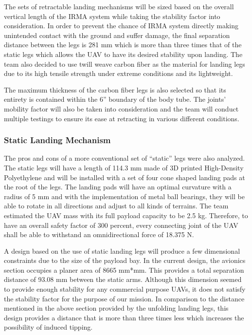 			The sets of retractable landing mechanisms will be sized based on the overall vertical length of the IRMA system while taking the stability factor into consideration. In order to prevent the chance of IRMA system directly making unintended contact with the ground and suffer damage, the final separation distance between the legs is 281 mm which is more than three times that of the static legs which allows the UAV to have its desired stability upon landing. The team also decided to use twill weave carbon fiber as the material for landing legs due to its high tensile strength under extreme conditions and its lightweight. 

            The maximum thickness of the carbon fiber legs is also selected so that its entirety is contained within the 6” boundary of the body tube. The joints’ mobility factor will also be taken into consideration and the team will conduct multiple testings to ensure its ease at retracting in various different conditions.


		\subsubsection{Static Landing Mechanism}
            The pros and cons of a more conventional set of “static” legs were also analyzed. The static legs will have a length of 114.3 mm made of 3D printed High-Density Polyethylene and will be installed with a set of four cone shaped landing pads at the root of the legs. The landing pads will have an optimal curvature with a radius of 5 mm and with the implementation of metal ball bearings, they will be able to rotate in all directions and adjust to all kinds of terrains. The team estimated the UAV mass with its full payload capacity to be 2.5 kg. Therefore, to have an overall safety factor of 300 percent, every connecting joint of the UAV shall be able to withstand an omnidirectional force of 18.375 N. 

            A design based on the use of static landing legs will produce a few dimensional constraints due to the size of the payload bay. In the current design, the avionics section occupies a planer area of 8665 mm*mm. This provides a total separation distance of 93.08 mm between the static arms. Although this dimension seemed to provide enough stability for any commercial purpose UAVs, it does not satisfy the stability factor for the purpose of our mission. In comparison to the distance mentioned in the above section provided by the unfolding landing legs, this design provides a distance that is more than three times less which increases the possibility of induced tipping. 
            
